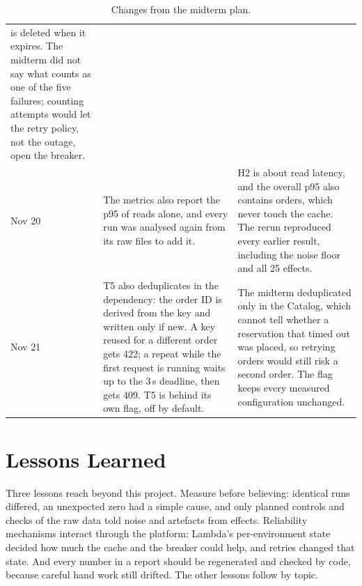 \documentclass[10pt]{article}
\begin{document}
\begin{table}[htbp]
\begin{tabularx}{\linewidth}{@{}l>{\RaggedRight}X>{\RaggedRight\arraybackslash}X@{}}
  is deleted when it expires. The midterm did not say what counts as one of the
  five failures; counting attempts would let the retry policy, not the outage,
  open the breaker. \\
Nov 20 & The metrics also report the p95 of reads alone, and every run was
  analysed again from its raw files to add it. &
  H2 is about read latency, and the overall p95 also contains orders, which
  never touch the cache. The rerun reproduced every earlier result, including
  the noise floor and all 25 effects. \\
Nov 21 & T5 also deduplicates in the dependency: the order ID is derived from
  the key and written only if new. A key reused for a different order gets
  422; a repeat while the first request is running waits up to the 3\,s
  deadline, then gets 409. T5 is behind its own flag, off by default. &
  The midterm deduplicated only in the Catalog, which cannot tell whether a
  reservation that timed out was placed, so retrying orders would still risk a
  second order. The flag keeps every measured configuration unchanged. \\
\bottomrule
\end{tabularx}
\caption{Changes from the midterm plan.}
\label{tab:changes}
\end{table}

\section{Lessons Learned}
Three lessons reach beyond this project. Measure before believing: identical
runs differed, an unexpected zero had a simple cause, and only planned
controls and checks of the raw data told noise and artefacts from effects.
Reliability mechanisms interact through the platform: Lambda's per-environment
state decided how much the cache and the breaker could help, and retries
changed that state. And every number in a report should be regenerated and
checked by code, because careful hand work still drifted. The other lessons
follow by topic.
\end{document}
